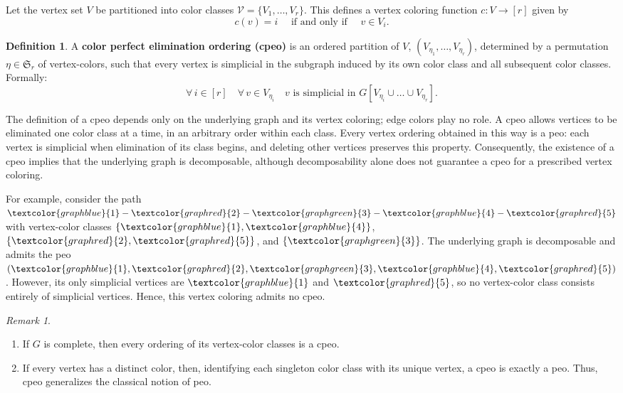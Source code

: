 \documentclass[12pt]{amsart}
\theoremstyle{plain}
\theoremstyle{definition}
\newtheorem{definition}[theorem]{Definition}
\theoremstyle{remark}
\newtheorem{remark}[theorem]{Remark}
\newcommand{\1}{\mathbf{1}}
\begin{document}
Let the vertex set $V$ be partitioned into color classes $\mathcal{V} = \{V_1,\ldots,V_r\}$. This defines a vertex coloring function $c\colon V\to [r]$ given by
\[
c(v)=i\quad\mbox{ if and only if }\quad v\in V_i.
\]

\begin{definition}
A \textbf{color perfect elimination ordering (cpeo)} is an ordered partition of $V$, $(V_{\eta_1},\ldots, V_{\eta_r})$, determined by a permutation $\eta\in\mathfrak{S}_r$ of  vertex-colors, such that every vertex is simplicial in the subgraph induced by its own color class and all subsequent color classes. Formally:
\[
\forall\, i\in [r]\quad \forall\, v\in V_{\eta_i}\quad v\mbox{ is simplicial in }G[V_{\eta_i}\cup \ldots \cup V_{\eta_r}]. 
\]
\end{definition}
The definition of a cpeo depends only on the underlying graph and its vertex coloring; edge colors play no role. A cpeo allows vertices to be eliminated one color class at a time, in an arbitrary order within each class. Every vertex ordering obtained in this way is a peo: each vertex is simplicial when elimination of its class begins, and deleting other vertices preserves this property. Consequently, the existence of a cpeo implies that the underlying graph is decomposable, although decomposability alone does not guarantee a cpeo for a prescribed vertex coloring.

For example, consider the path $\textcolor{graphblue}{1}-\textcolor{graphred}{2}-\textcolor{graphgreen}{3}-\textcolor{graphblue}{4}-\textcolor{graphred}{5}$ with vertex-color classes $\{\textcolor{graphblue}{1},\textcolor{graphblue}{4}\}$, $\{\textcolor{graphred}{2},\textcolor{graphred}{5}\}$, and $\{\textcolor{graphgreen}{3}\}$. The underlying graph is decomposable and admits the peo $(\textcolor{graphblue}{1},\textcolor{graphred}{2},\textcolor{graphgreen}{3},\textcolor{graphblue}{4},\textcolor{graphred}{5})$. However, its only simplicial vertices are $\textcolor{graphblue}{1}$ and $\textcolor{graphred}{5}$, so no vertex-color class consists entirely of simplicial vertices. Hence, this vertex coloring admits no cpeo.

\begin{remark}
\begin{enumerate}
\item[(i)] If $G$ is complete, then every ordering of its vertex-color classes is a cpeo.
\item[(ii)] If every vertex has a distinct color, then, identifying each singleton color class with its unique vertex, a cpeo is exactly a peo. Thus, cpeo generalizes the classical notion of peo.
\end{enumerate}
\end{remark}
\end{document}
